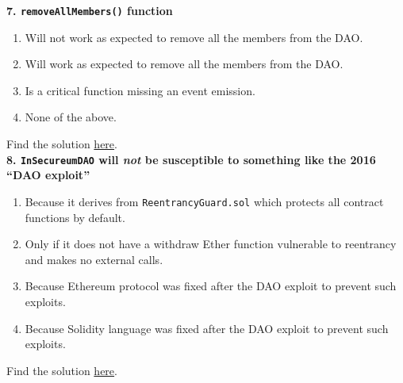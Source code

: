 \textbf{7. \texttt{removeAllMembers()} function}

\begin{enumerate}[label=\Alph*.]
    \item Will not work as expected to remove all the members from the DAO.
    \item Will work as expected to remove all the members from the DAO.
    \item Is a critical function missing an event emission.
    \item None of the above.
\end{enumerate}

Find the solution \hyperref[sec:exam7_q7]{here}.\\

\textbf{8. \texttt{InSecureumDAO} will \textit{not} be susceptible to something like the 2016 ``DAO exploit''}

\begin{enumerate}[label=\Alph*.]
    \item Because it derives from \verb|ReentrancyGuard.sol| which protects all contract functions by default.
    \item Only if it does not have a withdraw Ether function vulnerable to reentrancy and makes no external calls.
    \item Because Ethereum protocol was fixed after the DAO exploit to prevent such exploits.
    \item Because Solidity language was fixed after the DAO exploit to prevent such exploits.
\end{enumerate}

Find the solution \hyperref[sec:exam7_q8]{here}.\\